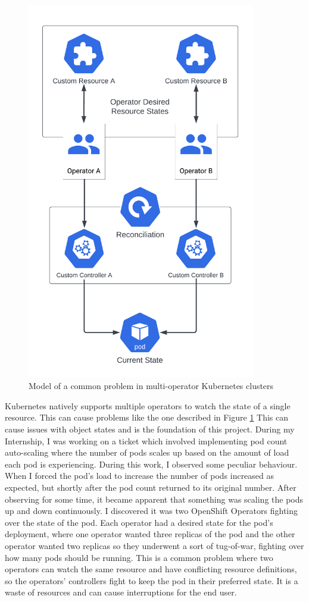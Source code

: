 \documentclass{article}
\begin{document}
\begin{figure}[!hb]
    \centering
    \includegraphics[width=100mm]{resources/problem-model.png}
    \caption{Model of a common problem in multi-operator Kubernetes clusters}
    \label{problem-model}
\end{figure}

Kubernetes natively supports multiple operators to watch the state of a single resource. This can cause problems like the one described in Figure \ref{problem-model}
This can cause issues with object states and is the foundation of this project. During my Internship, I was working on a ticket which involved implementing pod count auto-scaling where the number of pods scales up based on the amount of load each pod is experiencing. 
During this work, I observed some peculiar behaviour. When I forced the pod’s load to increase the number of pods increased as expected, but shortly after the pod count returned to its original number. 
After observing for some time, it became apparent that something was scaling the pods up and down continuously. 
I discovered it was two OpenShift Operators fighting over the state of the pod. 
Each operator had a desired state for the pod’s deployment, where one operator wanted three replicas of the pod and the other operator wanted two replicas so they underwent a sort of tug-of-war, fighting over how many pods should be running. 
This is a common problem where two operators can watch the same resource and have conflicting resource definitions, so the operators' controllers fight to keep the pod in their preferred state. It is a waste of resources and can cause interruptions for the end user.
\end{document}
